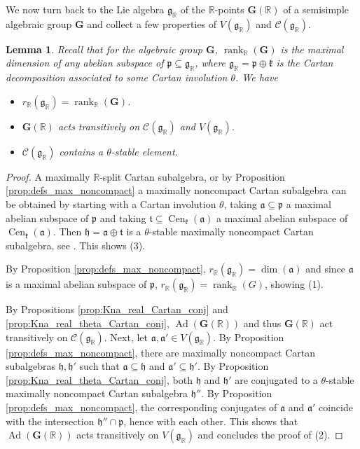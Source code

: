 \documentclass[12pt]{amsart}
\newcommand{\R}{\mathbb{R} }
\newcommand{\frakg}{\mathfrak{g}}
\newcommand{\frakp}{\mathfrak{p}}
\newcommand{\frakk}{\mathfrak{k}}
\newcommand{\fraka}{\mathfrak{a}}
\newcommand{\frakh}{\mathfrak{h}}
\newcommand{\frakt}{\mathfrak{t}}
\newcommand{\bG}{\mathbf{G}}
\numberwithin{equation}{section}
\newtheorem{lemma}[theorem]{Lemma}
\theoremstyle{remark} %
\begin{document}
We now turn back to the Lie algebra $\frakg_\R$ of the $\R$-points $\bG(\R)$ of a semisimple algebraic group $\bG$ and collect a few properties of $V(\frakg_\R)$ and $\mathcal{C}(\frakg_\R)$. 
\begin{lemma}\label{lem:basic_facts} Recall that for the algebraic group $\bG$, $ \operatorname{rank}_\R(\bG)$ is the maximal dimension of any abelian subspace of $\frakp \subseteq \frakg_\R$, where $\frakg_\R = \frakp \oplus \frakk$ is the Cartan decomposition associated to some Cartan involution $\theta$. We have
	\begin{itemize}
		\item [(1)] $r_\R(\frakg_\R) = \operatorname{rank}_\R(\bG)$.
		\item [(2)] $\bG(\R)$ acts transitively on $\mathcal{C}(\frakg_\R)$ and $ V(\frakg_\R)$.
		\item [(3)] $\mathcal{C}(\frakg_\R)$ contains a $\theta$-stable element. 
	\end{itemize}
\end{lemma}
\begin{proof}
	A maximally $\R$-split Cartan subalgebra, or by Proposition \ref{prop:defs_max_noncompact} a maximally noncompact Cartan subalgebra can be obtained by starting with a Cartan involution $\theta$, taking $\fraka \subseteq \frakp$ a maximal abelian subspace of $\frakp$ and taking $\frakt \subseteq \operatorname{Cen}_{\frakk}(\fraka)$ a maximal abelian subspace of $\operatorname{Cen}_{\frakk}(\fraka)$. Then
	$\frakh = \fraka \oplus \frakt$ is a $\theta$-stable maximally noncompact Cartan subalgebra, see \cite[Proposition 6.47]{Kna}. This shows (3).
	
	By Proposition \ref{prop:defs_max_noncompact}, $r_\R(\frakg_\R) = \dim(\fraka) $ and since $\fraka$ is a maximal abelian subspace of $\frakp$, $r_\R(\frakg_\R) = \operatorname{rank}_\R(G)$, showing (1).
	
	By Propositions \ref{prop:Kna_real_Cartan_conj} and \ref{prop:Kna_real_theta_Cartan_conj}, $\operatorname{Ad}(\bG(\R))$ and thus $\bG(\R)$ act transitively on $\mathcal{C}(\frakg_\R)$. Next, let $\fraka, \fraka'\in V(\frakg_\R)$. By Proposition \ref{prop:defs_max_noncompact}, there are maximally noncompact Cartan subalgebras $\frakh, \frakh'$ such that $\fraka \subseteq \frakh$ and $\fraka' \subseteq \frakh'$. By Proposition \ref{prop:Kna_real_theta_Cartan_conj}, both $\frakh$ and $\frakh'$ are conjugated to a $\theta$-stable maximally noncompact Cartan subalgebra $\frakh''$. By Proposition \ref{prop:defs_max_noncompact}, the corresponding conjugates of $\fraka$ and $\fraka'$ coincide with the intersection $\frakh'' \cap \frakp$, hence with each other. This shows that $\operatorname{Ad}(\bG(\R))$ acts transitively on $V(\frakg_\R)$ and concludes the proof of (2).
\end{proof}
\end{document}

